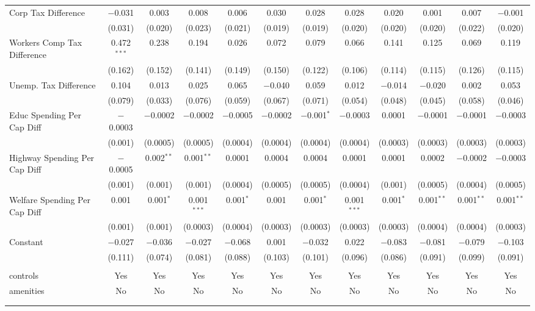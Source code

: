 \begin{table}[!htbp]
\begin{tabular}{@{\extracolsep{5pt}}lccccccccccc}
  Corp Tax Difference & $-$0.031 & 0.003 & 0.008 & 0.006 & 0.030 & 0.028 & 0.028 & 0.020 & 0.001 & 0.007 & $-$0.001 \\ 
  & (0.031) & (0.020) & (0.023) & (0.021) & (0.019) & (0.019) & (0.020) & (0.020) & (0.020) & (0.022) & (0.020) \\ 
  Workers Comp Tax Difference & 0.472$^{***}$ & 0.238 & 0.194 & 0.026 & 0.072 & 0.079 & 0.066 & 0.141 & 0.125 & 0.069 & 0.119 \\ 
  & (0.162) & (0.152) & (0.141) & (0.149) & (0.150) & (0.122) & (0.106) & (0.114) & (0.115) & (0.126) & (0.115) \\ 
  Unemp. Tax Difference & 0.104 & 0.013 & 0.025 & 0.065 & $-$0.040 & 0.059 & 0.012 & $-$0.014 & $-$0.020 & 0.002 & 0.053 \\ 
  & (0.079) & (0.033) & (0.076) & (0.059) & (0.067) & (0.071) & (0.054) & (0.048) & (0.045) & (0.058) & (0.046) \\ 
  Educ Spending Per Cap Diff & $-$0.0003 & $-$0.0002 & $-$0.0002 & $-$0.0005 & $-$0.0002 & $-$0.001$^{*}$ & $-$0.0003 & 0.0001 & $-$0.0001 & $-$0.0001 & $-$0.0003 \\ 
  & (0.001) & (0.0005) & (0.0005) & (0.0004) & (0.0004) & (0.0004) & (0.0004) & (0.0003) & (0.0003) & (0.0003) & (0.0003) \\ 
  Highway Spending Per Cap Diff & $-$0.0005 & 0.002$^{**}$ & 0.001$^{**}$ & 0.0001 & 0.0004 & 0.0004 & 0.0001 & 0.0001 & 0.0002 & $-$0.0002 & $-$0.0003 \\ 
  & (0.001) & (0.001) & (0.001) & (0.0004) & (0.0005) & (0.0005) & (0.0004) & (0.001) & (0.0005) & (0.0004) & (0.0005) \\ 
  Welfare Spending Per Cap Diff & 0.001 & 0.001$^{*}$ & 0.001$^{***}$ & 0.001$^{*}$ & 0.001 & 0.001$^{*}$ & 0.001$^{***}$ & 0.001$^{*}$ & 0.001$^{**}$ & 0.001$^{**}$ & 0.001$^{**}$ \\ 
  & (0.001) & (0.001) & (0.0003) & (0.0004) & (0.0003) & (0.0003) & (0.0003) & (0.0003) & (0.0004) & (0.0004) & (0.0003) \\ 
  Constant & $-$0.027 & $-$0.036 & $-$0.027 & $-$0.068 & 0.001 & $-$0.032 & 0.022 & $-$0.083 & $-$0.081 & $-$0.079 & $-$0.103 \\ 
  & (0.111) & (0.074) & (0.081) & (0.088) & (0.103) & (0.101) & (0.096) & (0.086) & (0.091) & (0.099) & (0.091) \\ 
 \hline \\[-1.8ex] 
controls & Yes & Yes & Yes & Yes & Yes & Yes & Yes & Yes & Yes & Yes & Yes \\ 
amenities & No & No & No & No & No & No & No & No & No & No & No \\ 
\hline \\[-1.8ex] 
\hline 
\hline \\[-1.8ex] 
\end{tabular} 
\end{table} 
